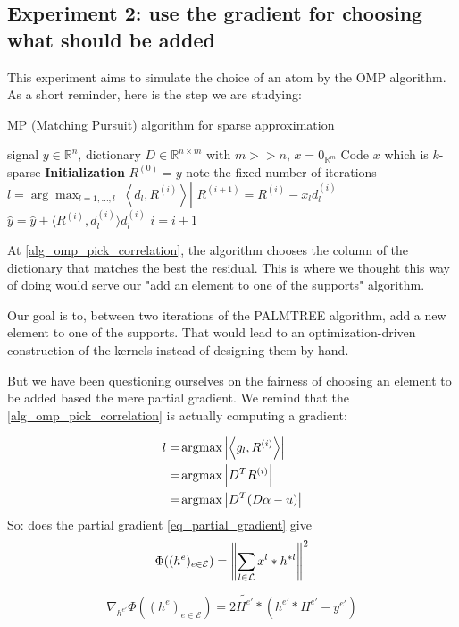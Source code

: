 \subsection{Experiment 2: use the gradient for choosing what should be added}
This experiment aims to simulate the choice of an atom by the OMP algorithm. As a short reminder, here is the step we are studying:
\begin{algorithm}[!ht] %
    \caption{MP (Matching Pursuit) algorithm for sparse approximation}
  \begin{algorithmic}[0]
    \Input signal $y \in \mathbb{R}^{n}$, dictionary $D \in \mathbb{R}^{n \times m}$ with $m>>n$, $x = 0_{\mathbb{R}^m}$
    \Output Code $x$ which is $k$-sparse
    \State \textbf{Initialization} $R^{(0)} = y$
     \Comment note the fixed number of iterations
      \State $l =  \arg\max_{l = 1,\dots,l} |\left< d_l,R^{(i)} \right>|$ \label{alg_omp_pick_correlation}
      \State $R^{(i+1)} = R^{(i)}-x_l d_l^{(i)}$
      \State $\hat{y} = \hat{y}+\langle R^{(i)}, d_{l}^{(i)} \rangle d_{l}^{(i)}$
      \State $i = i + 1$
    \EndWhile
  \end{algorithmic}
\end{algorithm}

At \cref{alg_omp_pick_correlation}, the algorithm chooses the column of the dictionary that matches the best the residual. This is where we thought this way of doing would serve our "add an element to one of the supports" algorithm.

Our goal is to, between two iterations of the PALMTREE algorithm, add a new element to one of the supports. That would lead to an optimization-driven construction of the kernels instead of designing them by hand.

But we have been questioning ourselves on the fairness of choosing an element to be added based the mere partial gradient. We remind that the \ref{alg_omp_pick_correlation} is actually computing a gradient:

\begin{align*}
l =& \operatorname*{\arg\!\max} \left|\left< g_l,R^{(i)} \right>\right| \\
=& \operatorname*{\arg\!\max} \left| D^TR^{(i)}\right| \\
=& \operatorname*{\arg\!\max} \left| D^T(D\alpha - u)\right| \\
\end{align*}
So: does the partial gradient \ref{eq_partial_gradient} give 
\begin{align*}
\Phi((h^e)_{e \in \mathcal{E}}) = \left\| \sum_{l\in\mathcal L} x^l * h^{*l} \right\|^2
\end{align*}
\begin{align*} 
\nabla_{h^{e'}}\Phi((h^e)_{e \in \mathcal{E}}) = 2 \widetilde{H^{e'}} * (h^{e'}*H^{e'}-y^{e'})
\end{align*} \label{eq_partial_gradient}



